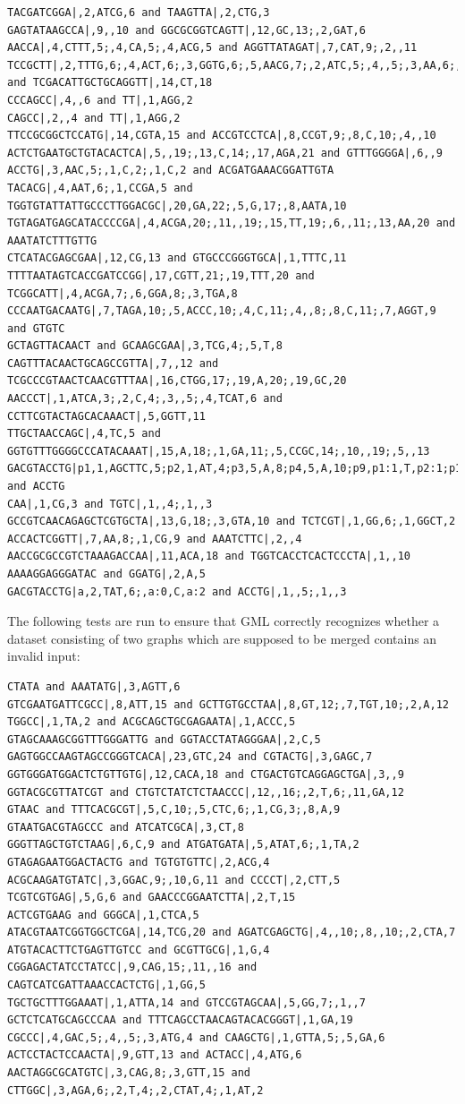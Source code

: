 \documentclass[a4paper,12pt,twoside,BCOR=10mm]{scrbook}
\begin{document}
\begin{lstlisting}
TACGATCGGA|,2,ATCG,6 and TAAGTTA|,2,CTG,3
GAGTATAAGCCA|,9,,10 and GGCGCGGTCAGTT|,12,GC,13;,2,GAT,6
AACCA|,4,CTTT,5;,4,CA,5;,4,ACG,5 and AGGTTATAGAT|,7,CAT,9;,2,,11
TCCGCTT|,2,TTTG,6;,4,ACT,6;,3,GGTG,6;,5,AACG,7;,2,ATC,5;,4,,5;,3,AA,6;,3,GGA,7 and TCGACATTGCTGCAGGTT|,14,CT,18
CCCAGCC|,4,,6 and TT|,1,AGG,2
CAGCC|,2,,4 and TT|,1,AGG,2
TTCCGCGGCTCCATG|,14,CGTA,15 and ACCGTCCTCA|,8,CCGT,9;,8,C,10;,4,,10
ACTCTGAATGCTGTACACTCA|,5,,19;,13,C,14;,17,AGA,21 and GTTTGGGGA|,6,,9
ACCTG|,3,AAC,5;,1,C,2;,1,C,2 and ACGATGAAACGGATTGTA
TACACG|,4,AAT,6;,1,CCGA,5 and TGGTGTATTATTGCCCTTGGACGC|,20,GA,22;,5,G,17;,8,AATA,10
TGTAGATGAGCATACCCCGA|,4,ACGA,20;,11,,19;,15,TT,19;,6,,11;,13,AA,20 and AAATATCTTTGTTG
CTCATACGAGCGAA|,12,CG,13 and GTGCCCGGGTGCA|,1,TTTC,11
TTTTAATAGTCACCGATCCGG|,17,CGTT,21;,19,TTT,20 and TCGGCATT|,4,ACGA,7;,6,GGA,8;,3,TGA,8
CCCAATGACAATG|,7,TAGA,10;,5,ACCC,10;,4,C,11;,4,,8;,8,C,11;,7,AGGT,9 and GTGTC
GCTAGTTACAACT and GCAAGCGAA|,3,TCG,4;,5,T,8
CAGTTTACAACTGCAGCCGTTA|,7,,12 and TCGCCCGTAACTCAACGTTTAA|,16,CTGG,17;,19,A,20;,19,GC,20
AACCCT|,1,ATCA,3;,2,C,4;,3,,5;,4,TCAT,6 and CCTTCGTACTAGCACAAACT|,5,GGTT,11
TTGCTAACCAGC|,4,TC,5 and GGTGTTTGGGGCCCATACAAAT|,15,A,18;,1,GA,11;,5,CCGC,14;,10,,19;,5,,13
GACGTACCTG|p1,1,AGCTTC,5;p2,1,AT,4;p3,5,A,8;p4,5,A,10;p9,p1:1,T,p2:1;p10,p2:1,ACT,p4:0;,p9:0,G,p10:1;,p2:1,,p4:0 and ACCTG
CAA|,1,CG,3 and TGTC|,1,,4;,1,,3
GCCGTCAACAGAGCTCGTGCTA|,13,G,18;,3,GTA,10 and TCTCGT|,1,GG,6;,1,GGCT,2
ACCACTCGGTT|,7,AA,8;,1,CG,9 and AAATCTTC|,2,,4
AACCGCGCCGTCTAAAGACCAA|,11,ACA,18 and TGGTCACCTCACTCCCTA|,1,,10
AAAAGGAGGGATAC and GGATG|,2,A,5
GACGTACCTG|a,2,TAT,6;,a:0,C,a:2 and ACCTG|,1,,5;,1,,3
\end{lstlisting}

The following tests are run to ensure that GML correctly recognizes whether a dataset
consisting of two graphs which are supposed to be merged contains an invalid input:

\begin{lstlisting}
CTATA and AAATATG|,3,AGTT,6
GTCGAATGATTCGCC|,8,ATT,15 and GCTTGTGCCTAA|,8,GT,12;,7,TGT,10;,2,A,12
TGGCC|,1,TA,2 and ACGCAGCTGCGAGAATA|,1,ACCC,5
GTAGCAAAGCGGTTTGGGATTG and GGTACCTATAGGGAA|,2,C,5
GAGTGGCCAAGTAGCCGGGTCACA|,23,GTC,24 and CGTACTG|,3,GAGC,7
GGTGGGATGGACTCTGTTGTG|,12,CACA,18 and CTGACTGTCAGGAGCTGA|,3,,9
GGTACGCGTTATCGT and CTGTCTATCTCTAACCC|,12,,16;,2,T,6;,11,GA,12
GTAAC and TTTCACGCGT|,5,C,10;,5,CTC,6;,1,CG,3;,8,A,9
GTAATGACGTAGCCC and ATCATCGCA|,3,CT,8
GGGTTAGCTGTCTAAG|,6,C,9 and ATGATGATA|,5,ATAT,6;,1,TA,2
GTAGAGAATGGACTACTG and TGTGTGTTC|,2,ACG,4
ACGCAAGATGTATC|,3,GGAC,9;,10,G,11 and CCCCT|,2,CTT,5
TCGTCGTGAG|,5,G,6 and GAACCCGGAATCTTA|,2,T,15
ACTCGTGAAG and GGGCA|,1,CTCA,5
ATACGTAATCGGTGGCTCGA|,14,TCG,20 and AGATCGAGCTG|,4,,10;,8,,10;,2,CTA,7
ATGTACACTTCTGAGTTGTCC and GCGTTGCG|,1,G,4
CGGAGACTATCCTATCC|,9,CAG,15;,11,,16 and CAGTCATCGATTAAACCACTCTG|,1,GG,5
TGCTGCTTTGGAAAT|,1,ATTA,14 and GTCCGTAGCAA|,5,GG,7;,1,,7
GCTCTCATGCAGCCCAA and TTTCAGCCTAACAGTACACGGGT|,1,GA,19
CGCCC|,4,GAC,5;,4,,5;,3,ATG,4 and CAAGCTG|,1,GTTA,5;,5,GA,6
ACTCCTACTCCAACTA|,9,GTT,13 and ACTACC|,4,ATG,6
AACTAGGCGCATGTC|,3,CAG,8;,3,GTT,15 and CTTGGC|,3,AGA,6;,2,T,4;,2,CTAT,4;,1,AT,2
\end{lstlisting}
\end{document}
